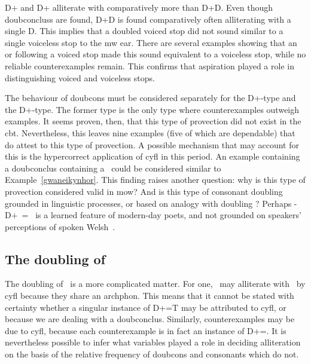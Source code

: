\gls{D}+ and \gls{D}+ alliterate with  comparatively more than \gls{D}+\gls{D}. Even though \gls{doubconclus}s are found, \gls{D}+\gls{D} is found comparatively often alliterating with a single \gls{D}. This implies that a doubled voiced stop did not sound similar to a single voiceless stop to the \gls{mw} ear. There are several examples showing that  an  or  following a voiced stop made this sound equivalent to a voiceless stop, while no reliable counterexamples remain. This confirms  that aspiration played a role in distinguishing voiced and voiceless stops. 

The behaviour of \gls{doubcon}s must be considered separately for the \gls{D}+\xD-type and the \gls{D}+\lT-type. The former type is the only type where counterexamples outweigh examples. It seems proven, then, that this type of provection did not exist in the \gls{cbt}. Nevertheless, this leaves nine examples (five of which are dependable) that do attest to this type of provection. A possible mechanism that may account for this is the hypercorrect application of \gls{cyfl} in this period. An example containing a \gls{doubconclus} containing a \xD\ could be considered similar to Example~\ref{gwaneikynhor}. This finding raises another question: why is this type of provection considered valid in \gls{mow}?  And is this type of consonant doubling grounded in linguistic processes, or based on analogy with doubling \lT? Perhaps -\gls{D}+\xD\ = \xT\ is a learned feature of modern-day poets, and  not  grounded on speakers' perceptions of spoken Welsh~\autocite{jones_y_2015}.

\subsection{The doubling of {\lT}}
\label{sec:doubling-lt}
The doubling of \lT\ is a more complicated matter. For one, \lT\ may alliterate with \xT\ by \gls{cyfl} because they share an \gls{archphon}. This means that it cannot be stated with certainty whether a singular instance of \gls{D}+\lT=\gls{T} may be attributed to \gls{cyfl}, or because we are dealing with a \gls{doubconclus}. Similarly, counterexamples may be due to \gls{cyfl}, because each counterexample is in fact an instance of \gls{D}+\lT=\lT. It is nevertheless possible to infer what variables played a role in deciding alliteration on the basis of the relative frequency of \gls{doubcon}s and consonants which do not. 

